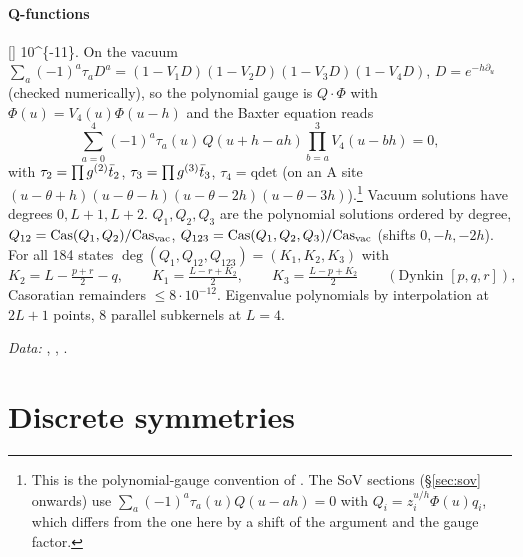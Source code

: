\paragraph{Q-functions} [] \num{10^{-11}}. On the vacuum
$\sum_a(-1)^a\tau_aD^a=(1-V_1D)(1-V_2D)(1-V_3D)(1-V_4D)$, $D=e^{-h\partial_u}$ (checked numerically), so the polynomial
gauge is $Q\cdot\Phi$ with $\Phi(u)=V_4(u)\Phi(u-h)$ and the Baxter equation reads
\begin{equation}
 \sum_{a=0}^4(-1)^a\tau_a(u)\,Q(u+h-ah)\prod_{b=a}^3V_4(u-bh)=0 ,
\end{equation}
with $\tau_2=\prod g^{(2)}\bar t_2$, $\tau_3=\prod g^{(3)}\bar t_3$, $\tau_4=\mathrm{qdet}$ (on an A site $(u-\theta+h)(u-\theta-h)(u-\theta-2h)(u-\theta-3h)$).\footnote{This is
the polynomial-gauge convention of . The SoV sections (\S\ref{sec:sov} onwards) use $\sum_a(-1)^a\tau_a(u)Q(u-ah)=0$ with $Q_i=z_i^{u/h}\Phi(u)q_i$,
which differs from the one here by a shift of the argument and the gauge factor.} Vacuum solutions have degrees $0,L+1,L+2$. $Q_1,Q_2,Q_3$ are the polynomial
solutions ordered by degree, $Q_{12}=\mathrm{Cas}(Q_1,Q_2)/\mathrm{Cas}_{\rm vac}$, $Q_{123}=\mathrm{Cas}(Q_1,Q_2,Q_3)/\mathrm{Cas}_{\rm vac}$ (shifts $0,-h,-2h$).
For all 184 states $\deg(Q_1,Q_{12},Q_{123})=(K_1,K_2,K_3)$ with
\begin{equation}
 K_2=L-\tfrac{p+r}2-q,\qquad K_1=\tfrac{L-r+K_2}2,\qquad K_3=\tfrac{L-p+K_2}2\qquad(\text{Dynkin }[p,q,r]),
\end{equation}
Casoratian remainders $\le8\cdot10^{-12}$. Eigenvalue polynomials by interpolation at $2L+1$ points, 8 parallel subkernels at $L=4$.
{\raggedright\emph{Data:} , , .\par}

\section{Discrete symmetries}\label{sec:sym}

